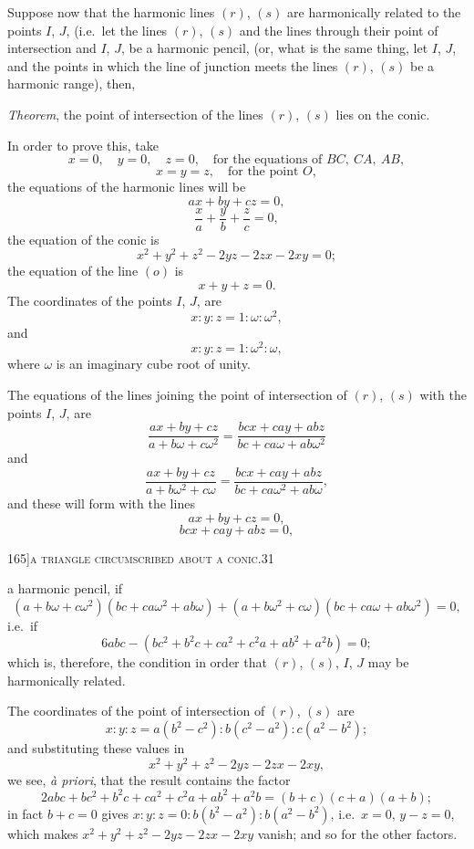 \documentclass[11pt]{article}
\begin{document}
Suppose now that the harmonic lines $(r)$, $(s)$ are harmonically related to the points
$I$, $J$, (i.e.\ let the lines $(r)$, $(s)$ and the lines through their point of intersection and
$I$, $J$, be a harmonic pencil, (or, what is the same thing, let $I$, $J$, and the points in
which the line of junction meets the lines $(r)$, $(s)$ be a harmonic range), then,

\textit{Theorem}, the point of intersection of the lines $(r)$, $(s)$ lies on the conic.

In order to prove this, take
\[
x = 0,\quad y = 0,\quad z = 0,\quad\text{for the equations of } BC,\ CA,\ AB,
\]
\[
x = y = z,\quad\text{for the point } O,
\]
the equations of the harmonic lines will be
\[
ax + by + cz = 0,
\]
\[
\frac{x}{a} + \frac{y}{b} + \frac{z}{c} = 0,
\]
the equation of the conic is
\[
x^{2} + y^{2} + z^{2} - 2yz - 2zx - 2xy = 0;
\]
the equation of the line $(o)$ is
\[
x + y + z = 0.
\]
The coordinates of the points $I$, $J$, are
\[
x : y : z = 1 : \omega : \omega^{2},
\]
and
\[
x : y : z = 1 : \omega^{2} : \omega,
\]
where $\omega$ is an imaginary cube root of unity.

The equations of the lines joining the point of intersection of $(r)$, $(s)$ with the
points $I$, $J$, are
\[
\frac{ax + by + cz}{a + b\omega + c\omega^{2}} = \frac{bcx + cay + abz}{bc + ca\omega + ab\omega^{2}}
\]
and
\[
\frac{ax + by + cz}{a + b\omega^{2} + c\omega} = \frac{bcx + cay + abz}{bc + ca\omega^{2} + ab\omega},
\]
and these will form with the lines
\[
ax + by + cz = 0,
\]
\[
bcx + cay + abz = 0,
\]

\newpage

\begin{center}
\small 165]\hfill\textsc{a triangle circumscribed about a conic.}\hfill\textsc{31}
\end{center}

\medskip

\noindent a harmonic pencil, if
\[
(a + b\omega + c\omega^{2})(bc + ca\omega^{2} + ab\omega)
+ (a + b\omega^{2} + c\omega)(bc + ca\omega + ab\omega^{2}) = 0,
\]
i.e.\ if
\[
6abc - (bc^{2} + b^{2}c + ca^{2} + c^{2}a + ab^{2} + a^{2}b) = 0;
\]
which is, therefore, the condition in order that $(r)$, $(s)$, $I$, $J$ may be harmonically
related.

The coordinates of the point of intersection of $(r)$, $(s)$ are
\[
x : y : z = a(b^{2} - c^{2}) : b(c^{2} - a^{2}) : c(a^{2} - b^{2});
\]
and substituting these values in
\[
x^{2} + y^{2} + z^{2} - 2yz - 2zx - 2xy,
\]
we see, \textit{\`a priori}, that the result contains the factor
\[
2abc + bc^{2} + b^{2}c + ca^{2} + c^{2}a + ab^{2} + a^{2}b = (b+c)(c+a)(a+b);
\]
in fact $b + c = 0$ gives $x : y : z = 0 : b(b^{2}-a^{2}) : b(a^{2}-b^{2})$, i.e.\ $x = 0$, $y - z = 0$, which
makes $x^{2} + y^{2} + z^{2} - 2yz - 2zx - 2xy$ vanish; and so for the other factors.
\end{document}

